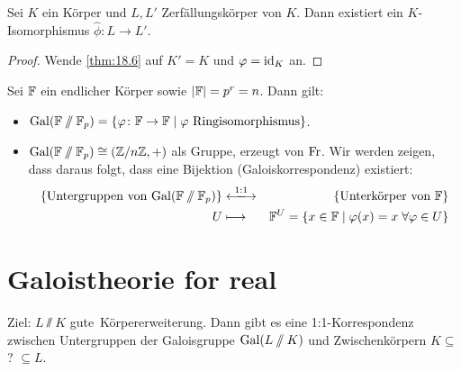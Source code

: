 \documentclass[12pt,a4paper]{scrartcl}
\begin{document}
\begin{satz}
	Sei $K$ ein Körper und $L, L'$ Zerfällungskörper von $K$. Dann existiert ein $K$-Isomorphismus $\hat\phi\colon L\to L'$. 
\end{satz}
\begin{proof}
	Wende \cref{thm:18.6} auf $K' = K$ und $\varphi = \operatorname{id}_K$ an.
\end{proof}
\begin{satz}
	Sei $\mathbb F$ ein endlicher Körper sowie $|\mathbb F| = p^r = n$. Dann gilt:
	\begin{itemize}
		\item $\operatorname{Gal}(\mathbb F\sslash\mathbb F_p) = \{\varphi\colon \mathbb F\to \mathbb F\mid\text{$\varphi$ Ringisomorphismus}\}$.
		\item $\operatorname{Gal}(\mathbb F\sslash\mathbb F_p) \cong (\mathbb Z/n\mathbb Z, +)$ als Gruppe, erzeugt von $\operatorname{Fr}$. Wir werden zeigen, dass daraus folgt, dass eine Bijektion \textup(Galoiskorrespondenz\textup) existiert:
		\begin{eqnarray*}
			\{\text{Untergruppen von $\Gal(\IF\sslash\IF_p)$}\}&\xlongleftrightarrow{1:1}&\{\text{Unterkörper von $\IF$}\}\\
			U &\longmapsto & \IF^U = \{x\in\IF\mid \phi(x) = x \;\forall \phi\in U\}
		\end{eqnarray*}
	\end{itemize}
\end{satz}

\section{Galoistheorie for real}
Ziel: $L\sslash K$ \glqq gute\grqq\ Körpererweiterung. Dann gibt es eine 1:1-Korrespondenz zwischen Untergruppen der Galoisgruppe $\operatorname{Gal}(L\sslash K)$ und Zwischenkörpern $K\subseteq$ ? $\subseteq L$.
\end{document}
